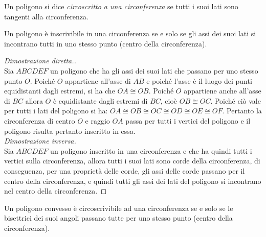 \begin{definizione}
Un poligono si dice \emph{circoscritto a una circonferenza} se tutti i suoi lati sono tangenti alla circonferenza.
\end{definizione}

\begin{figure}[htb]
	\centering
\end{figure}

\begin{teorema}
Un poligono è inscrivibile in una circonferenza se e solo se gli assi dei suoi lati si incontrano tutti in uno stesso punto (centro della circonferenza).
\end{teorema}

\begin{figure}[htb]
	\centering
\end{figure}
\begin{proof}[Dimostrazione diretta.]~\\
Sia $ABCDEF$ un poligono che ha gli assi dei suoi lati che passano per uno stesso punto $O$. Poiché $O$ appartiene all'asse di $AB$ e poiché l'asse è il luogo dei punti equidistanti dagli estremi, si ha che $OA\cong OB$. Poiché $O$ appartiene anche all'asse di $BC$ allora $O$ è equidistante dagli estremi di $BC$, cioè $OB\cong OC$. Poiché ciò vale per tutti i lati del poligono si ha: $OA\cong OB\cong OC\cong OD\cong OE\cong OF$. Pertanto la circonferenza di centro $O$ e raggio $OA$ passa per tutti i vertici del poligono e il poligono risulta pertanto inscritto in essa.\vspace{4pt}\\
\emph{Dimostrazione inversa.}\\
Sia $ABCDEF$ un poligono inscritto in una circonferenza e che ha quindi tutti i vertici sulla circonferenza, allora tutti i suoi lati sono corde della circonferenza, di conseguenza, per una proprietà delle corde, gli assi delle corde passano per il centro della circonferenza, e quindi tutti gli assi dei lati del poligono si incontrano nel centro della circonferenza.
\end{proof}

\begin{teorema}
Un poligono convesso è circoscrivibile ad una circonferenza se e solo se le bisettrici dei suoi angoli passano tutte per uno stesso punto (centro della circonferenza).
\end{teorema}


